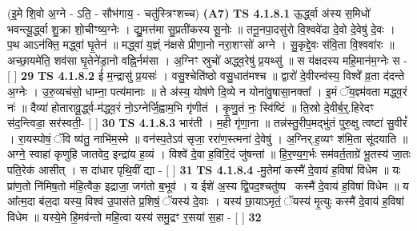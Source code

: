 \documentclass[17pt]{extarticle}
\begin{document}
                      (इ॒मे शि॒वो अ॒ग्ने - ऽति॒ - सौभ॑गाय॒ - चतु॑स्त्रिꣳशच्च)  \textbf{(A7)} \newline \newline
                                        \textbf{ TS 4.1.8.1} \newline
                  ऊ॒र्द्ध्वा अ॑स्य स॒मिधो॑ भवन्त्यू॒र्द्ध्वा शु॒क्रा शो॒चीꣳष्य॒ग्नेः । द्यु॒मत्त॑मा सु॒प्रती॑कस्य सू॒नोः ॥ तनू॒नपा॒दसु॑रो वि॒श्ववे॑दा दे॒वो दे॒वेषु॑ दे॒वः । प॒थ आऽन॑क्ति॒ मद्ध्वा॑ घृ॒तेन॑ ॥ मद्ध्वा॑ य॒ज्ञ्ं न॑क्षसे प्रीणा॒नो नरा॒शꣳसो॑ अग्ने । सु॒कृद्दे॒वः स॑वि॒ता वि॒श्ववा॑रः ॥ अच्छा॒यमे॑ति॒ शव॑सा घृ॒तेने॑डा॒नो वह्नि॒र्नम॑सा । अ॒ग्निꣳ स्रुचो॑ अद्ध्व॒रेषु॑ प्र॒यथ्सु॑ ॥ स य॑क्षदस्य महि॒मान॑म॒ग्नेः स - [  ] \textbf{  29 } \newline
                  \newline
                                \textbf{ TS 4.1.8.2} \newline
                  ई॑ म॒न्द्रासु॑ प्र॒यसः॑ । वसु॒श्चेति॑ष्ठो वसु॒धात॑मश्च ॥ द्वारो॑ दे॒वीरन्व॑स्य॒ विश्वे᳚ व्र॒ता द॑दन्ते अ॒ग्नेः । उ॒रु॒व्यच॑सो॒ धाम्ना॒ पत्य॑मानाः ॥ ते अ॑स्य॒ योष॑णे दि॒व्ये न योना॑वु॒षासा॒नक्ता᳚ । इ॒मं ॅय॒ज्ञ्म॑वता मद्ध्व॒रं नः॑ ॥ दैव्या॑ होतारावू॒र्द्ध्व-म॑द्ध्व॒रं नो॒ऽग्नेर्जि॒ह्वाम॒भि गृ॑णीतं । कृ॒णु॒तं नः॒ स्वि॑ष्टिं ॥ ति॒स्रो दे॒वीर्ब॒र्॒.हिरेदꣳ स॑द॒न्त्विडा॒ सर॑स्वती॒- [  ] \textbf{  30} \newline
                  \newline
                                \textbf{ TS 4.1.8.3} \newline
                  भार॑ती । म॒ही गृ॑णा॒ना ॥ तन्न॑स्तु॒रीप॒मद्भु॑तं पुरु॒क्षु त्वष्टा॑ सु॒वीरं᳚ । रा॒यस्पोषं॒ ॅवि ष्य॑तु॒ नाभि॑म॒स्मे ॥ वन॑स्प॒तेऽव॑ सृजा॒ ररा॑ण॒स्त्मना॑ दे॒वेषु॑ । अ॒ग्निर्.ह॒व्यꣳ श॑मि॒ता सू॑दयाति ॥ अग्ने॒ स्वाहा॑ कृणुहि जातवेद॒ इन्द्रा॑य ह॒व्यं । विश्वे॑ दे॒वा ह॒विरि॒दं जु॑षन्तां ॥ हि॒र॒ण्य॒ग॒र्भः सम॑वर्त॒ताग्रे॑ भू॒तस्य॑ जा॒तः पति॒रेक॑ आसीत् । स दा॑धार पृथि॒वीं द्या - [  ] \textbf{  31} \newline
                  \newline
                                \textbf{ TS 4.1.8.4} \newline
                  -मु॒तेमां कस्मै॑ दे॒वाय॑ ह॒विषा॑ विधेम ॥ यः प्रा॑ण॒तो नि॑मिष॒तो म॑हि॒त्वैक॒ इद्राजा॒ जग॑तो ब॒भूव॑ । य ईशे॑ अ॒स्य द्वि॒पद॒श्चतु॑ष्पदः᳡कस्मै॑ दे॒वाय॑ ह॒विषा॑ विधेम ॥ य आ᳚त्म॒दा ब॑ल॒दा यस्य॒ विश्व॑ उ॒पास॑ते प्र॒शिषं॒ ॅयस्य॑ दे॒वाः । यस्य॑ छा॒याऽमृतं॒ ॅयस्य॑ मृ॒त्युः कस्मै॑ दे॒वाय॑ ह॒विषा॑ विधेम ॥ यस्ये॒मे हि॒मव॑न्तो महि॒त्वा यस्य॑ समु॒द्रꣳ र॒सया॑ स॒हा - [  ] \textbf{  32} \newline
\end{document}
